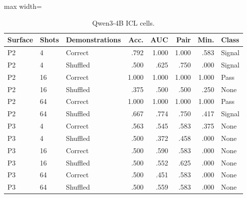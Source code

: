 \documentclass[10pt,a4paper]{article}
\begin{document}
\begin{table}[H]
\centering
\caption{Qwen3-4B ICL cells.}
\begin{adjustbox}{max width=\textwidth}
\begin{tabular}{lllrrrrl}
\toprule
Surface & Shots & Demonstrations & Acc. & AUC & Pair & Min. & Class \\
\midrule
P2 & 4  & Correct  & .792 & 1.000 & 1.000 & .583 & Signal \\
P2 & 4  & Shuffled & .500 & .625 & .750 & .000 & Signal \\
P2 & 16 & Correct  & 1.000 & 1.000 & 1.000 & 1.000 & Pass \\
P2 & 16 & Shuffled & .375 & .500 & .500 & .250 & None \\
P2 & 64 & Correct  & 1.000 & 1.000 & 1.000 & 1.000 & Pass \\
P2 & 64 & Shuffled & .667 & .774 & .750 & .417 & Signal \\
P3 & 4  & Correct  & .563 & .545 & .583 & .375 & None \\
P3 & 4  & Shuffled & .500 & .372 & .458 & .000 & None \\
P3 & 16 & Correct  & .500 & .590 & .583 & .000 & None \\
P3 & 16 & Shuffled & .500 & .552 & .625 & .000 & None \\
P3 & 64 & Correct  & .500 & .451 & .583 & .000 & None \\
P3 & 64 & Shuffled & .500 & .559 & .583 & .000 & None \\
\bottomrule
\end{tabular}
\end{adjustbox}
\end{table}
\end{document}
